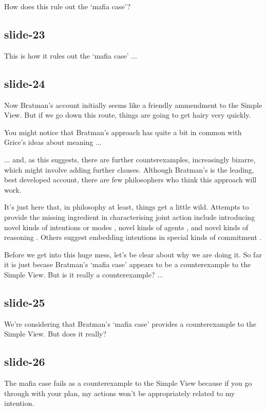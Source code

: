 \documentclass[12pt,\papersize]{extarticle}
\begin{document}
How does this rule out the ‘mafia case’?

\subsection{slide-23}
This is how it  rules out the ‘mafia case’ ...

\subsection{slide-24}
Now Bratman’s account initially seems like a friendly ammendment to the Simple View.
But if we go down this route, things are going to get hairy very quickly.

You might notice that Bratman’s approach has quite a bit in common with Grice’s ideas
about meaning ...

... and, as this suggests, there are further counterexamples, increasingly bizarre,
which might involve adding further clauses.
Although Bratman’s is the leading, best developed account, there are few philosophers
who think this approach will work.

It’s just here that, in philosophy at least, things get a little wild.
Attempts to provide the missing ingredient in characterising joint action
include introducing novel kinds of intentions \citep{Searle:1990em} or
modes \citep{gallotti:2013_social}, novel kinds of agents \citep{helm_plural_2008},
and novel kinds of reasoning \citep{Gold:2007zd}.
Others suggest embedding intentions in special kinds of commitment \citep{gilbert:2014_book}.

Before we get into this huge mess, let’s be clear about why we are doing it.
So far it is just becase Bratman’s ‘mafia case’ appears to be a counterexample to
the Simple View.  But is it really a counterexample? ...

\subsection{slide-25}
We’re considering that Bratman’s ‘mafia case’ provides a counterexample to
the Simple View.  But does it really?


\subsection{slide-26}
The mafia case fails as a counterexample to the Simple View because if you go through
with your plan, my actions won’t be appropriately related to my intention.
\end{document}
